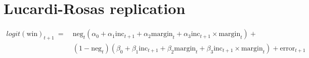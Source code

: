 \documentclass[letter,12pt]{article}
\begin{document}


\section{Lucardi-Rosas replication}

\begin{equation}
  \begin{split}
  logit(\text{win})_{t+1} ~=~ & \text{neg}_t (\alpha_0 + \alpha_1 \text{inc}_{t+1} + \alpha_2 \text{margin}_t + \alpha_3 \text{inc}_{t+1} \times \text{margin}_t) + \\
                             & (1 - \text{neg}_t) (\beta_0 + \beta_1 \text{inc}_{t+1} + \beta_2 \text{margin}_t + \beta_3 \text{inc}_{t+1} \times \text{margin}_t) + \text{error}_{t+1}
  \end{split}
\end{equation}
\end{document}
